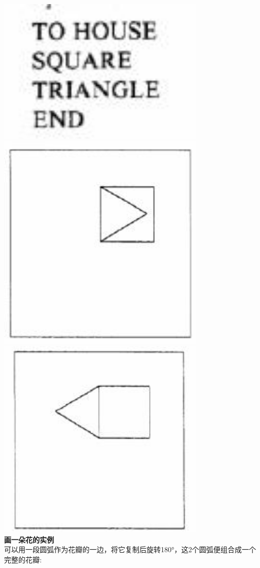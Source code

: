 \includegraphics[width=10cm]{mindstorm_p721.jpg}\\
\includegraphics[width=10cm]{mindstorm_p722.jpg}\\
\includegraphics[width=10cm]{mindstorm_p73.jpg}\\
\textbf{画一朵花的实例}\\
可以用一段圆弧作为花瓣的一边，将它复制后旋转180°，这2个圆弧便组合成一个完整的花瓣:

